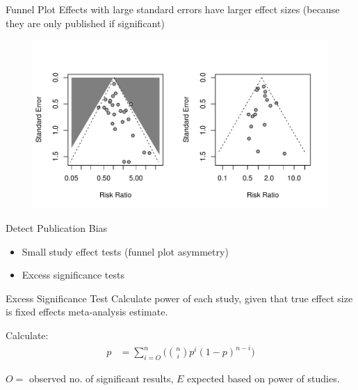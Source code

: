 \documentclass[english]{beamer}\usepackage[]{graphicx}\usepackage[]{color}
\makeatletter
\def\maxwidth{ %
  \ifdim\Gin@nat@width>\linewidth
    \linewidth
  \else
    \Gin@nat@width
  \fi
}
\newenvironment{knitrout}{}{} %
\makeatother
\begin{document}
\begin{frame}[fragile]{Funnel Plot}
Effects with large standard errors have larger effect sizes (because they are only published
if significant)

\vspace{-10mm}
\begin{figure}
\begin{knitrout}
\color{fgcolor}
\includegraphics[width=\maxwidth]{figure/unnamed-chunk-3-1} 

\end{knitrout}
\end{figure}
\end{frame}

\begin{frame}{Detect Publication Bias}
\begin{itemize}
\item Small study effect tests (funnel plot asymmetry)
\item Excess significance tests
\end{itemize}
\end{frame}

\begin{frame}{Excess Significance Test}
Calculate power of each study, given that true effect size is
fixed effects meta-analysis estimate.

Calculate:
\begin{align}
p &= \sum_{i = O}^n\Big({n \choose i} p^i (1-p)^{n - i}\Big) \nonumber
\end{align}

\vspace{-1mm}
$O = $ observed no. of significant results, $E$ expected based on power of studies.
\end{frame}
\end{document}
